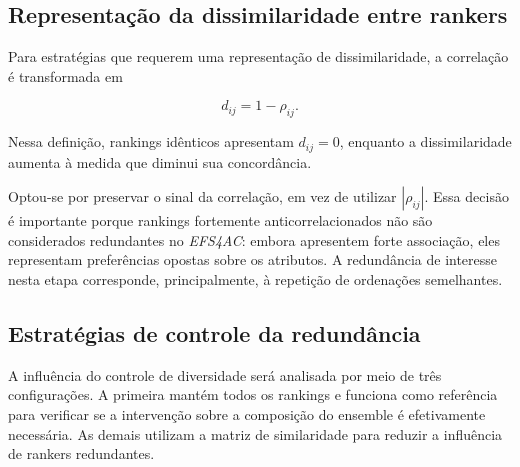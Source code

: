 \subsection{Representação da dissimilaridade entre rankers}
\label{subsec:ac-efs-distancia}

Para estratégias que requerem uma representação de dissimilaridade, a
correlação é transformada em

\begin{equation}
    d_{ij}
    =
    1-\rho_{ij}.
    \label{eq:distancia-ac-efs}
\end{equation}

Nessa definição, rankings idênticos apresentam $d_{ij}=0$, enquanto a
dissimilaridade aumenta à medida que diminui sua concordância.

Optou-se por preservar o sinal da correlação, em vez de utilizar
$|\rho_{ij}|$. Essa decisão é importante porque rankings fortemente
anticorrelacionados não são considerados redundantes no \textit{EFS4AC}:
embora apresentem forte associação, eles representam preferências opostas sobre
os atributos. A redundância de interesse nesta etapa corresponde,
principalmente, à repetição de ordenações semelhantes.


\subsection{Estratégias de controle da redundância}
\label{subsec:ac-efs-estrategias-diversidade}

A influência do controle de diversidade será analisada por meio de três
configurações. A primeira mantém todos os rankings e funciona como referência
para verificar se a intervenção sobre a composição do ensemble é efetivamente
necessária. As demais utilizam a matriz de similaridade para reduzir a
influência de rankers redundantes.

